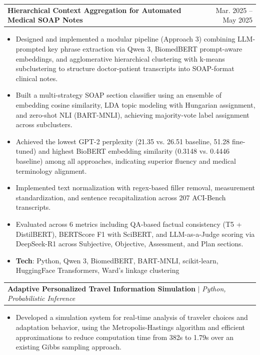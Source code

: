 \documentclass[letterpaper,11pt]{article}
\makeatletter
\newcommand{\resumeItem}[1]{
  \item\small{
    {#1 \vspace{-2pt}}
  }
}
\newcommand{\resumeProjectHeading}[2]{
    \item
    \begin{tabular*}{0.97\textwidth}{l@{\extracolsep{\fill}}r}
      \small#1 & #2 \\
    \end{tabular*}\vspace{-7pt}
}
\newcommand{\resumeItemListStart}{\begin{itemize}[noitemsep, topsep=0pt, parsep=0pt]}
\newcommand{\resumeItemListEnd}{\end{itemize}\vspace{-5pt}}
\makeatother
\begin{document}

  \resumeProjectHeading
    {\textbf{Hierarchical Context Aggregation for Automated Medical SOAP Notes}}{Mar. 2025 -- May 2025}
    \resumeItemListStart
      \resumeItem{Designed and implemented a modular pipeline (Approach 3) combining LLM-prompted key phrase extraction via Qwen 3, BiomedBERT prompt-aware embeddings, and agglomerative hierarchical clustering with k-means subclustering to structure doctor-patient transcripts into SOAP-format clinical notes.}
      \resumeItem{Built a multi-strategy SOAP section classifier using an ensemble of embedding cosine similarity, LDA topic modeling with Hungarian assignment, and zero-shot NLI (BART-MNLI), achieving majority-vote label assignment across subclusters.}
      \resumeItem{Achieved the lowest GPT-2 perplexity (21.35 vs. 26.51 baseline, 51.28 fine-tuned) and highest BioBERT embedding similarity (0.3148 vs. 0.4446 baseline) among all approaches, indicating superior fluency and medical terminology alignment.}
      \resumeItem{Implemented text normalization with regex-based filler removal, measurement standardization, and sentence recapitalization across 207 ACI-Bench transcripts.}
      \resumeItem{Evaluated across 6 metrics including QA-based factual consistency (T5 + DistilBERT), BERTScore F1 with SciBERT, and LLM-as-a-Judge scoring via DeepSeek-R1 across Subjective, Objective, Assessment, and Plan sections.}
      \resumeItem{\textbf{Tech}{: Python, Qwen 3, BiomedBERT, BART-MNLI, scikit-learn, HuggingFace Transformers, Ward's linkage clustering}}
    \resumeItemListEnd

  \resumeProjectHeading
    {\textbf{Adaptive Personalized Travel Information Simulation} $|$ \emph{Python, Probabilistic Inference}}{}
    \resumeItemListStart
      \resumeItem{Developed a simulation system for real-time analysis of traveler choices and adaptation behavior, using the Metropolis-Hastings algorithm and efficient approximations to reduce computation time from 382s to 1.79s over an existing Gibbs sampling approach.}
    \resumeItemListEnd
\end{document}
